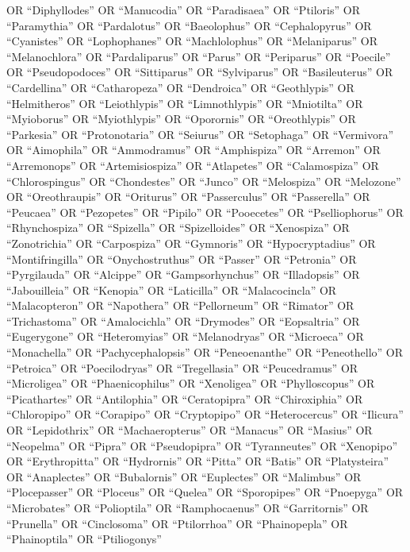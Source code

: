 \documentclass[
  number,
  review,
  onecolumn]{elsarticle}
\begin{document}
OR ``Diphyllodes'' OR ``Manucodia'' OR ``Paradisaea'' OR ``Ptiloris'' OR
``Paramythia'' OR ``Pardalotus'' OR ``Baeolophus'' OR ``Cephalopyrus''
OR ``Cyanistes'' OR ``Lophophanes'' OR ``Machlolophus'' OR
``Melaniparus'' OR ``Melanochlora'' OR ``Pardaliparus'' OR ``Parus'' OR
``Periparus'' OR ``Poecile'' OR ``Pseudopodoces'' OR ``Sittiparus'' OR
``Sylviparus'' OR ``Basileuterus'' OR ``Cardellina'' OR ``Catharopeza''
OR ``Dendroica'' OR ``Geothlypis'' OR ``Helmitheros'' OR ``Leiothlypis''
OR ``Limnothlypis'' OR ``Mniotilta'' OR ``Myioborus'' OR ``Myiothlypis''
OR ``Oporornis'' OR ``Oreothlypis'' OR ``Parkesia'' OR ``Protonotaria''
OR ``Seiurus'' OR ``Setophaga'' OR ``Vermivora'' OR ``Aimophila'' OR
``Ammodramus'' OR ``Amphispiza'' OR ``Arremon'' OR ``Arremonops'' OR
``Artemisiospiza'' OR ``Atlapetes'' OR ``Calamospiza'' OR
``Chlorospingus'' OR ``Chondestes'' OR ``Junco'' OR ``Melospiza'' OR
``Melozone'' OR ``Oreothraupis'' OR ``Oriturus'' OR ``Passerculus'' OR
``Passerella'' OR ``Peucaea'' OR ``Pezopetes'' OR ``Pipilo'' OR
``Pooecetes'' OR ``Pselliophorus'' OR ``Rhynchospiza'' OR ``Spizella''
OR ``Spizelloides'' OR ``Xenospiza'' OR ``Zonotrichia'' OR
``Carpospiza'' OR ``Gymnoris'' OR ``Hypocryptadius'' OR
``Montifringilla'' OR ``Onychostruthus'' OR ``Passer'' OR ``Petronia''
OR ``Pyrgilauda'' OR ``Alcippe'' OR ``Gampsorhynchus'' OR ``Illadopsis''
OR ``Jabouilleia'' OR ``Kenopia'' OR ``Laticilla'' OR ``Malacocincla''
OR ``Malacopteron'' OR ``Napothera'' OR ``Pellorneum'' OR ``Rimator'' OR
``Trichastoma'' OR ``Amalocichla'' OR ``Drymodes'' OR ``Eopsaltria'' OR
``Eugerygone'' OR ``Heteromyias'' OR ``Melanodryas'' OR ``Microeca'' OR
``Monachella'' OR ``Pachycephalopsis'' OR ``Peneoenanthe'' OR
``Peneothello'' OR ``Petroica'' OR ``Poecilodryas'' OR ``Tregellasia''
OR ``Peucedramus'' OR ``Microligea'' OR ``Phaenicophilus'' OR
``Xenoligea'' OR ``Phylloscopus'' OR ``Picathartes'' OR ``Antilophia''
OR ``Ceratopipra'' OR ``Chiroxiphia'' OR ``Chloropipo'' OR ``Corapipo''
OR ``Cryptopipo'' OR ``Heterocercus'' OR ``Ilicura'' OR ``Lepidothrix''
OR ``Machaeropterus'' OR ``Manacus'' OR ``Masius'' OR ``Neopelma'' OR
``Pipra'' OR ``Pseudopipra'' OR ``Tyranneutes'' OR ``Xenopipo'' OR
``Erythropitta'' OR ``Hydrornis'' OR ``Pitta'' OR ``Batis'' OR
``Platysteira'' OR ``Anaplectes'' OR ``Bubalornis'' OR ``Euplectes'' OR
``Malimbus'' OR ``Plocepasser'' OR ``Ploceus'' OR ``Quelea'' OR
``Sporopipes'' OR ``Pnoepyga'' OR ``Microbates'' OR ``Polioptila'' OR
``Ramphocaenus'' OR ``Garritornis'' OR ``Prunella'' OR ``Cinclosoma'' OR
``Ptilorrhoa'' OR ``Phainopepla'' OR ``Phainoptila'' OR ``Ptiliogonys''
\end{document}
